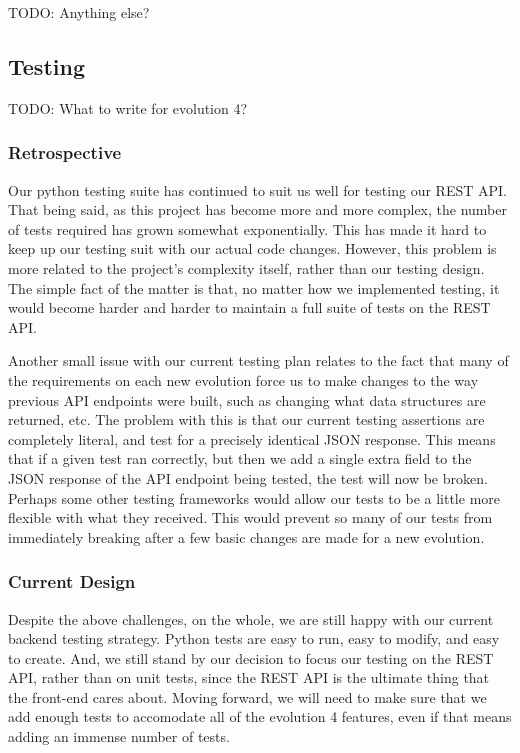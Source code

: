 \documentclass[12pt]{article}
\begin{document}
TODO: Anything else? 


\subsection{Testing}

TODO: What to write for evolution 4? 

\subsubsection{Retrospective}
Our python testing suite has continued to suit us well for testing our REST API. That being said, as this project has become more and more complex, the number of tests required has grown somewhat exponentially. This has made it hard to keep up our testing suit with our actual code changes. However, this problem is more related to the project's complexity itself, rather than our testing design. The simple fact of the matter is that, no matter how we implemented testing, it would become harder and harder to maintain a full suite of tests on the REST API. 

Another small issue with our current testing plan relates to the fact that many of the requirements on each new evolution force us to make changes to the way previous API endpoints were built, such as changing what data structures are returned, etc. The problem with this is that our current testing assertions are completely literal, and test for a precisely identical JSON response. This means that if a given test ran correctly, but then we add a single extra field to the JSON response of the API endpoint being tested, the test will now be broken. Perhaps some other testing frameworks would allow our tests to be a little more flexible with what they received. This would prevent so many of our tests from immediately breaking after a few basic changes are made for a new evolution. 

\subsubsection{Current Design}
Despite the above challenges, on the whole, we are still happy with our current backend testing strategy. Python tests are easy to run, easy to modify, and easy to create. And, we still stand by our decision to focus our testing on the REST API, rather than on unit tests, since the REST API is the ultimate thing that the front-end cares about. Moving forward, we will need to make sure that we add enough tests to accomodate all of the evolution 4 features, even if that means adding an immense number of tests. 
\end{document}
